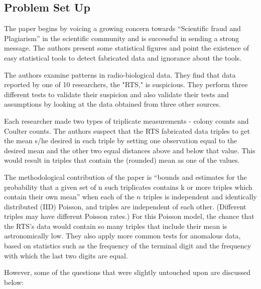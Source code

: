 \documentclass{article}
\begin{document}
\subsection{Problem Set Up}\label{problem-set-up}

The paper begins by voicing a growing concern towards ``Scientific fraud
and Plagiarism'' in the scientific community and is successful in
sending a strong message. The authors present some statistical figures and point the existence of easy statistical tools to detect fabricated data and ignorance about the tools. 

The authors examine patterns in radio-biological data. They find that data reported by one of 10 researchers, the "RTS," is suspicious. 
They perform three different
tests to validate their suspicion and also validate their tests and
assumptions by looking at the data obtained from three other sources.

Each researcher made two types of triplicate measurements - colony counts and Coulter counts.  
The authors suspect that the RTS fabricated data triples to get the mean s/he desired in each triple by setting one observation equal to the desired mean and the other two equal distances above and below that value. This would result in triples that contain the (rounded) mean as one of the values.

The methodological contribution of the paper is “bounds and estimates for the probability that a given set of n such triplicates contains k or more triples which contain their own mean” when each of the $n$ triples is independent and identically distributed (IID) Poisson, and triples are independent of each other. (Different triples may have different Poisson rates.)
For this Poisson model, the chance that the RTS's data would contain so many triples that include their mean is astronomically low.
They also apply more common tests for anomalous data, based on statistics such as the frequency of the terminal digit and the frequency with which the last two digits are equal.

However, some of the questions that were slightly untouched upon are discussed below:
\end{document}
